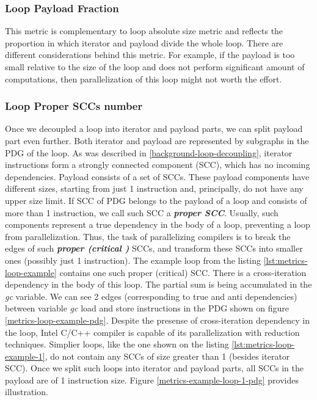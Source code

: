 \subsubsection{Loop Payload Fraction}
\label{metrics-loop-payload-fraction}
\qquad This metric is complementary to loop absolute size metric and reflects the proportion in which iterator and payload divide the whole loop. There are different considerations behind this metric. For example, if the payload is too small relative to the size of the loop and does not perform significant amount of computations, then parallelization of this loop might not worth the effort.   

\subsubsection{Loop Proper SCCs number}
\label{metrics-loop-proper-sccs-number}
\qquad Once we decoupled a loop into iterator and payload parts, we can split payload part even further. Both iterator and payload are represented by subgraphs in the PDG of the loop. As was described in \ref{background-loop-decoupling}, iterator instructions form a strongly connected component (SCC), which has no incoming dependencies. Payload consists of a set of SCCs. These payload components have different sizes, starting from just 1 instruction and, principally, do not have any upper size limit. If SCC of PDG belongs to the payload of a loop and consists of more than 1 instruction, we call such SCC a \textbf{\textit{proper SCC}}. Usually, such components represent a true dependency in the body of a loop, preventing a loop from parallelization. Thus, the task of parallelizing compilers is to break the edges of such \textbf{\textit{proper (critical )}} SCCs, and transform these SCCs into smaller ones (possibly just 1 instruction). \newline
\null\qquad The example loop from the listing \ref{lst:metrics-loop-example} contains one such proper (critical) SCC. There is a cross-iteration dependency in the body of this loop. The partial sum is being accumulated in the \textit{gc} variable. We can see 2 edges (corresponding to true and anti dependencies) between variable \textit{gc} load and store instructions in the PDG shown on figure \ref{metrics-loop-example-pdg}. Despite the presense of cross-iteration dependency in the loop, Intel C/C++ compiler is capable of its parallelization with reduction techniques.\newline
\null\qquad Simplier loops, like the one shown on the listing \ref{lst:metrics-loop-example-1}, do not contain any SCCs of size greater than 1 (besides iterator SCC). Once we split such loops into iterator and payload parts, all SCCs in the payload are of 1 instruction size. Figure \ref{metrics-example-loop-1-pdg} provides illustration.
  

